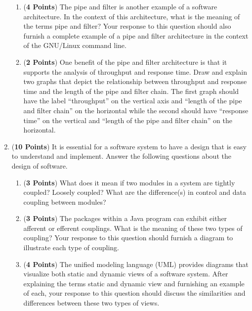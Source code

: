 \documentclass[12pt,epsf,psfig,graphicx]{article}
\begin{document}
\begin{enumerate}
\begin{enumerate}
\item ({\bf 4 Points}) The pipe and filter is another example of a software architecture.  In the context of this
	architecture, what is the meaning of the terms pipe and filter?  Your response to this question should
	also furnish a complete example of a pipe and filter architecture in the context of the GNU/Linux command line.

\item ({\bf 2 Points}) One benefit of the pipe and filter architecture is that it supports the analysis of throughput
	and response time.  Draw and explain two graphs that depict the relationship between throughput and 	response
	time and the length of the pipe and filter chain.  The first graph should have the label ``throughput'' on the
	vertical axis and ``length of the pipe and filter chain'' on the horizontal while the second should have ``response
	time'' on the vertical and ``length of the pipe and filter chain'' on the horizontal.

\end{enumerate}

\newpage


\item ({\bf 10 Points}) It is essential for a software system to have a design that is easy to understand and implement.
	Answer the following questions about the design of software.

\begin{enumerate}

\item ({\bf 3 Points}) What does it mean if two modules in a system are tightly coupled? Loosely coupled? What are the
	difference(s) in control and data coupling between modules?

% 
% 

\item ({\bf 3 Points}) The packages within a Java program can exhibit either afferent or efferent couplings.  What is
	the meaning of these two types of coupling? Your response to this question should furnish a diagram to illustrate
	each type of coupling.   

\item ({\bf 4 Points}) The unified modeling language (UML) provides diagrams that visualize both static and dynamic
	views of a software system.  After explaining the terms static and dynamic view and furnishing an example of each,
	your response to this question should discuss the similarities and differences between these two types of views.


\end{enumerate}
\end{enumerate}
\end{document}
